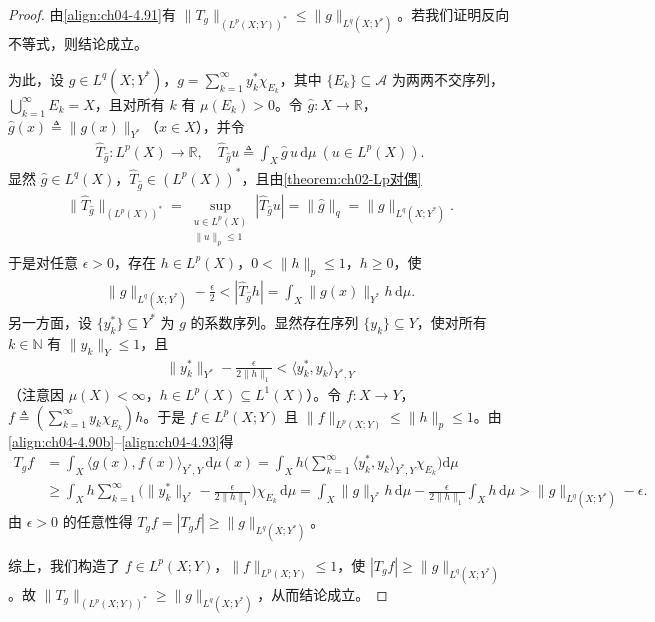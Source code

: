 \documentclass[../../main.tex]{subfiles}%
\begin{document}
\begin{proof}
由\eqref{align:ch04-4.91}有 $\|T_g\|_{(L^p(X;Y))^*}\leqslant\|g\|_{L^q(X;Y^*)}$。若我们证明反向不等式，则结论成立。

为此，设 $g\in L^q(X;Y^*)$，$g=\sum_{k=1}^\infty y_k^*\chi_{E_k}$，其中 $\{E_k\}\subseteq\mathcal{A}$ 为两两不交序列，$\bigcup_{k=1}^\infty E_k=X$，且对所有 $k$ 有 $\mu(E_k)>0$。令 $\hat g:X\to\mathbb{R}$，$\hat g(x)\triangleq \|g(x)\|_{Y^*}$（$x\in X$），并令
\begin{align*}
\widehat{T}_{\hat g}:L^p(X)\to\mathbb{R},\quad \widehat{T}_{\hat g}u\triangleq \int_X\hat g\,u\,\mathrm{d}\mu\ (u\in L^p(X)).
\end{align*}
显然 $\hat g\in L^q(X)$，$\widehat{T}_{\hat g}\in(L^p(X))^*$，且由\cref{theorem:ch02-Lp对偶}
\begin{align*}
\|\widehat{T}_{\hat g}\|_{(L^p(X))^*}=\sup_{\substack{u\in L^p(X)\\\|u\|_p\leqslant1}}|\widehat{T}_{\hat g}u|=\|\hat g\|_q=\|g\|_{L^q(X;Y^*)}.
\end{align*}
于是对任意 $\epsilon>0$，存在 $h\in L^p(X)$，$0<\|h\|_p\leqslant1$，$h\geqslant0$，使
\begin{align}
\|g\|_{L^q(X;Y^*)}-\frac{\epsilon}{2}<|\widehat{T}_{\hat g}h|=\int_X\|g(x)\|_{Y^*}h\,\mathrm{d}\mu. \label{align:ch04-4.92}
\end{align}
另一方面，设 $\{y_k^*\}\subseteq Y^*$ 为 $g$ 的系数序列。显然存在序列 $\{y_k\}\subseteq Y$，使对所有 $k\in\mathbb{N}$ 有 $\|y_k\|_Y\leqslant1$，且
\begin{align}
\|y_k^*\|_{Y^*}-\frac{\epsilon}{2\|h\|_1}<\langle y_k^*,y_k\rangle_{Y^*,Y} \label{align:ch04-4.93}
\end{align}
（注意因 $\mu(X)<\infty$，$h\in L^p(X)\subseteq L^1(X)$）。令 $f:X\to Y$，$f\triangleq (\sum_{k=1}^\infty y_k\chi_{E_k})h$。于是 $f\in L^p(X;Y)$ 且 $\|f\|_{L^p(X;Y)}\leqslant\|h\|_p\leqslant1$。由\eqref{align:ch04-4.90b}--\eqref{align:ch04-4.93}得
\begin{align*}
T_gf&=\int_X\langle g(x),f(x)\rangle_{Y^*,Y}\,\mathrm{d}\mu(x)
=\int_X h\Big(\sum_{k=1}^\infty\langle y_k^*,y_k\rangle_{Y^*,Y}\chi_{E_k}\Big)\mathrm{d}\mu\\
&\geqslant\int_X h\sum_{k=1}^\infty\Big(\|y_k^*\|_{Y^*}-\frac{\epsilon}{2\|h\|_1}\Big)\chi_{E_k}\,\mathrm{d}\mu
=\int_X\|g\|_{Y^*}h\,\mathrm{d}\mu-\frac{\epsilon}{2\|h\|_1}\int_X h\,\mathrm{d}\mu>\|g\|_{L^q(X;Y^*)}-\epsilon.
\end{align*}
由 $\epsilon>0$ 的任意性得 $T_gf=|T_gf|\geqslant\|g\|_{L^q(X;Y^*)}$。

综上，我们构造了 $f\in L^p(X;Y)$，$\|f\|_{L^p(X;Y)}\leqslant1$，使 $|T_gf|\geqslant\|g\|_{L^q(X;Y^*)}$。故 $\|T_g\|_{(L^p(X;Y))^*}\geqslant\|g\|_{L^q(X;Y^*)}$，从而结论成立。
\end{proof}
\end{document}
